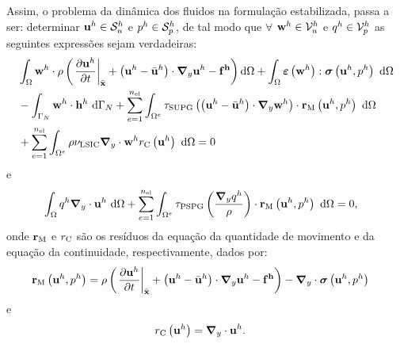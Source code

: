 Assim, o problema da dinâmica dos fluidos na formulação estabilizada, passa a ser: determinar $\mathbf{u}^h \in \mathcal{S}_u^h$ e $p^h \in \mathcal{S}_p^h$, de tal modo que $\forall$ $\mathbf{w}^h \in \mathcal{V}_u^h$ e $q^h \in \mathcal{V}_p^h$ as seguintes expressões sejam verdadeiras:
\begin{align}
	\begin{split}
		&\int_{\Omega} \mathbf{w}^h \cdot \rho\left(\left. \frac{\partial\mathbf{u}^h}{\partial t}\right|_{\bar{\mathbf{x}}}+ \left(\mathbf{u}^h - \bar{\mathbf{u}}^h \right) \cdot \boldsymbol{\nabla}_y \mathbf{u}^h - \mathbf{f^h}\right) \mathrm{d} \Omega +\int_{\Omega} \bm{\varepsilon} \left(\mathbf{w}^h\right) : \boldsymbol{\sigma} \left(\mathbf{u}^h,p^h\right)\ \mathrm{d} \Omega\\ &
		- \int_{\Gamma_{N}}\mathbf{w}^h \cdot \mathbf{h}^{h} \ \mathrm{d} \Gamma_{N} 
		+ \sum_{e=1}^{n_{\mathrm{el}}} \int_{\Omega^e} \tau_{\mathrm{SUPG}} \left(\left(\mathbf{u}^h - \bar{\mathbf{u}}^h \right) \cdot \boldsymbol{\nabla}_y \mathbf{w}^h\right) \cdot \mathbf{r}_{\mathrm{M}}\left(\mathbf{u}^h,p^h \right)\  \mathrm{d} \Omega\\
		&+ \sum_{e=1}^{n_{\mathrm{el}}} \int_{\Omega^e} \rho \nu_{\mathrm{LSIC}} \boldsymbol{\nabla}_y \cdot \mathbf{w}^h {r}_{\mathrm{C}}\left(\mathbf{u}^h\right)\  \mathrm{d} \Omega = 0
		\label{eq:QM_forma_fraca}
	\end{split}
\end{align}
\noindent e
\begin{align}
	\begin{split}
		&\int_{\Omega}q^h \boldsymbol{\nabla}_y \cdot \mathbf{u}^h \ \mathrm{d} \Omega
		+ \sum_{e=1}^{n_{\mathrm{el}}} \int_{\Omega^e} \tau_{\mathrm{PSPG}} \left(\frac{\boldsymbol{\nabla}_y q^h}{\rho}\right) \cdot \mathbf{r}_{\mathrm{M}}\left(\mathbf{u}^h,p^h\right) \  \mathrm{d} \Omega = 0,
		\label{eq:C_forma_fraca}
	\end{split}
\end{align}
\noindent onde $\mathbf{r}_{\mathrm{M}}$ e ${r}_{\mathrm{C}}$ são os resíduos da equação da quantidade de movimento e da equação da continuidade, respectivamente, dados por:
\begin{align}
	\mathbf{r}_{\mathrm{M}}\left(\mathbf{u}^h,p^h\right)&=\rho\left(\left. \frac{\partial\mathbf{u}^h}{\partial t}\right|_{\bar{\mathbf{x}}}+\left(\mathbf{u}^h - \bar{\mathbf{u}}^h \right)\cdot \boldsymbol{\nabla}_y \mathbf{u}^h - \mathbf{f^h}\right) - \boldsymbol{\nabla}_y \cdot \boldsymbol{\sigma}\left(\mathbf{u}^h,p^h\right)
\end{align}
\noindent e
\begin{align}
	{r}_{\mathrm{C}}\left(\mathbf{u}^h\right)&=\boldsymbol{\nabla}_y \cdot \mathbf{u}^h.
\end{align}

